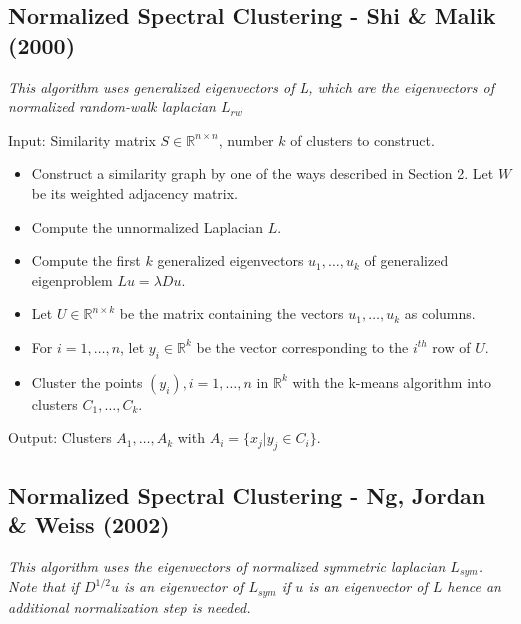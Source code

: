 \documentclass[10pt,a4paper, nocenter]{report}
\begin{document}
	\subsection{Normalized Spectral Clustering - Shi \& Malik (2000)\cite{Shi-Malik-maxcut-00}}
	\textit{This algorithm uses generalized eigenvectors of L, which are the eigenvectors of normalized random-walk laplacian $L_{rw}$}
	
	Input: Similarity matrix $S \in \mathbb{R}^{n\times n}$, number $k$ of clusters to construct.
	\begin{itemize}
		\item Construct a similarity graph by one of the ways described in Section 2. Let $W$ be its weighted adjacency matrix.
		\item Compute the unnormalized Laplacian $L$.
		\item Compute the first $k$ generalized eigenvectors $u_{1},\dots, u_{k} $ of generalized eigenproblem $Lu = \lambda Du$.
		\item Let $U \in \mathbb{R}^{n\times k}$ be the matrix containing the vectors $u_{1},\dots, u_{k}$ as columns.
		\item For $i = 1,\dots, n$, let $y_{i} \in \mathbb{R}^k$ be the vector corresponding to the $i^{th}$ row of $U$.
		\item Cluster the points $(y_{i}), i=1,\dots,n$ in $\mathbb{R}^k$ with the k-means algorithm into clusters $C_{1},\dots, C_{k}$.
	\end{itemize}
	Output: Clusters $A_{1},\dots, A_{k}$ with $A_{i} = \{x_{j}| y_{j} \in C_{i}\}$.

	\subsection{Normalized Spectral Clustering - Ng, Jordan \& Weiss (2002)\cite{ng-jordan-01}}
	\textit{This algorithm uses the eigenvectors of normalized symmetric laplacian $L_{sym}$. Note that if $D^{1/2}u$ is an eigenvector of $L_{sym}$ if $u$ is an eigenvector of $L$ hence an additional normalization step is needed.}
\end{document}
